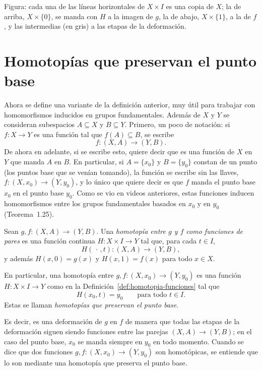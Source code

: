 \documentclass[11pt]{article}
\begin{document}
\noindent Figura: cada una de las líneas horizontales de $X\times I$ es una copia de $X$; la de arriba, $X\times\{0\}$, se manda con $H$ a la imagen de $g$, la de abajo, $X\times\{1\}$, a la de $f$, y las intermedias (en gris) a las etapas de la deformación.

\section*{Homotopías que preservan el punto base}

Ahora se define una variante de la definición anterior, muy útil para trabajar con homomorfismos inducidos en grupos fundamentales. Además de $X$ y $Y$ se consideran subespacios $A\subseteq X$ y $B\subseteq Y$. Primero, un poco de notación: si $f\colon X\to Y$ es una función tal que $f(A)\subseteq B$, se escribe
\[
  f\colon (X,A)\to(Y,B).
\]
De ahora en adelante, si se escribe esto, quiere decir que es una función de $X$ en $Y$ que manda $A$ en $B$. En particular, si $A=\{x_0\}$ y $B=\{y_0\}$ constan de un punto (los puntos base que se venían tomando), la función se escribe sin las llaves, $f\colon (X,x_0)\to(Y,y_0)$, y lo único que quiere decir es que $f$ manda el punto base $x_0$ en el punto base $y_0$. Como se vio en videos anteriores, estas funciones inducen homomorfismos entre los grupos fundamentales basados en $x_0$ y en $y_0$ (Teorema~1.25).

\begin{defn}\label{def:homotopia-pares}
Sean $g,f\colon (X,A)\to(Y,B)$. Una \emph{homotopía entre $g$ y $f$ como funciones de pares} es una función continua $H\colon X\times I\to Y$ tal que, para cada $t\in I$,
\[
  H(\,\cdot\,,t)\colon (X,A)\to(Y,B),
\]
y además $H(x,0)=g(x)$ y $H(x,1)=f(x)$ para todo $x\in X$.

En particular, una homotopía entre $g,f\colon (X,x_0)\to(Y,y_0)$ es una función $H\colon X\times I\to Y$ como en la Definición~\ref{def:homotopia-funciones} tal que
\[
  H(x_0,t)=y_0\qquad\text{para todo }t\in I.
\]
Estas se llaman \emph{homotopías que preservan el punto base}.
\end{defn}

Es decir, es una deformación de $g$ en $f$ de manera que todas las etapas de la deformación siguen siendo funciones entre las parejas $(X,A)\to(Y,B)$; en el caso del punto base, $x_0$ se manda siempre en $y_0$ en todo momento. Cuando se dice que dos funciones $g,f\colon (X,x_0)\to(Y,y_0)$ son homotópicas, se entiende que lo son mediante una homotopía que preserva el punto base.
\end{document}
